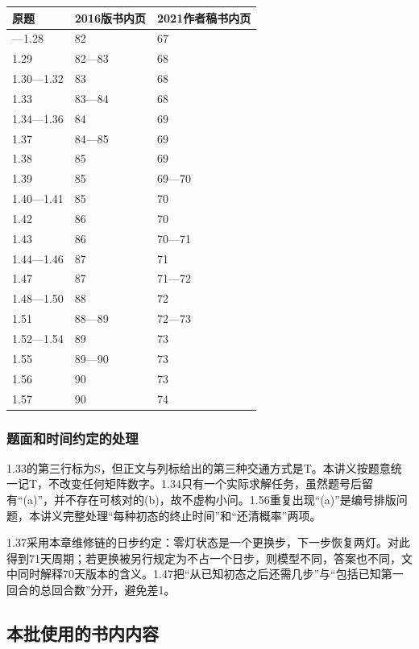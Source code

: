 \documentclass[
  11pt,
  a4paper,
  UTF8,
  fontset=fandol]{ctexart}
\begin{document}
\begin{longtable}[]{@{}lll@{}}
\toprule\noalign{}
原题 & 2016版书内页 & 2021作者稿书内页 \\
\midrule\noalign{}
\endhead
\bottomrule\noalign{}
\endlastfoot
1.26---1.28 & 82 & 67 \\
1.29 & 82---83 & 68 \\
1.30---1.32 & 83 & 68 \\
1.33 & 83---84 & 68 \\
1.34---1.36 & 84 & 69 \\
1.37 & 84---85 & 69 \\
1.38 & 85 & 69 \\
1.39 & 85 & 69---70 \\
1.40---1.41 & 85 & 70 \\
1.42 & 86 & 70 \\
1.43 & 86 & 70---71 \\
1.44---1.46 & 87 & 71 \\
1.47 & 87 & 71---72 \\
1.48---1.50 & 88 & 72 \\
1.51 & 88---89 & 72---73 \\
1.52---1.54 & 89 & 73 \\
1.55 & 89---90 & 73 \\
1.56 & 90 & 73 \\
1.57 & 90 & 74 \\
\end{longtable}

\subsubsection{题面和时间约定的处理}\label{ux9898ux9762ux548cux65f6ux95f4ux7ea6ux5b9aux7684ux5904ux7406}

1.33的第三行标为S，但正文与列标给出的第三种交通方式是T。本讲义按题意统一记T，不改变任何矩阵数字。1.34只有一个实际求解任务，虽然题号后留有``(a)''，并不存在可核对的(b)，故不虚构小问。1.56重复出现``(a)''是编号排版问题，本讲义完整处理``每种初态的终止时间''和``还清概率''两项。

1.37采用本章维修链的日步约定：零灯状态是一个更换步，下一步恢复两灯。对此得到71天周期；若更换被另行规定为不占一个日步，则模型不同，答案也不同，文中同时解释70天版本的含义。1.47把``从已知初态之后还需几步''与``包括已知第一回合的总回合数''分开，避免差1。

\subsection{本批使用的书内内容}\label{ux672cux6279ux4f7fux7528ux7684ux4e66ux5185ux5185ux5bb9}
\end{document}
